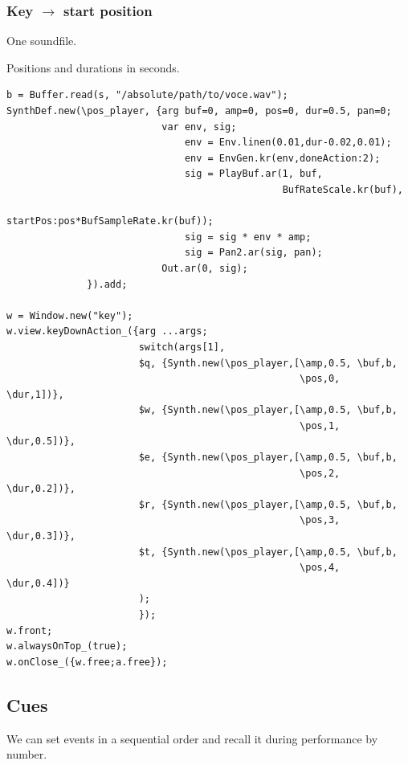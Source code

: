 \subsubsection{Key \(\rightarrow\) start position }\label{key-start-position}

One soundfile.

Positions and durations in seconds.

\begin{lstlisting}[frame=single, caption=playback key-start-position model] 
b = Buffer.read(s, "/absolute/path/to/voce.wav");
SynthDef.new(\pos_player, {arg buf=0, amp=0, pos=0, dur=0.5, pan=0;
                           var env, sig;
                               env = Env.linen(0.01,dur-0.02,0.01);
                               env = EnvGen.kr(env,doneAction:2);
                               sig = PlayBuf.ar(1, buf, 
                                                BufRateScale.kr(buf),
                                       startPos:pos*BufSampleRate.kr(buf));
                               sig = sig * env * amp;
                               sig = Pan2.ar(sig, pan);
                           Out.ar(0, sig);
              }).add;

w = Window.new("key");
w.view.keyDownAction_({arg ...args;
                       switch(args[1],
                       $q, {Synth.new(\pos_player,[\amp,0.5, \buf,b,
                                                   \pos,0,   \dur,1])},
                       $w, {Synth.new(\pos_player,[\amp,0.5, \buf,b,
                                                   \pos,1,   \dur,0.5])},
                       $e, {Synth.new(\pos_player,[\amp,0.5, \buf,b,
                                                   \pos,2,   \dur,0.2])},
                       $r, {Synth.new(\pos_player,[\amp,0.5, \buf,b,
                                                   \pos,3,   \dur,0.3])},
                       $t, {Synth.new(\pos_player,[\amp,0.5, \buf,b,
                                                   \pos,4,   \dur,0.4])}     
                       );
                       });
w.front;
w.alwaysOnTop_(true);
w.onClose_({w.free;a.free});
\end{lstlisting} 

\subsection{Cues}\label{cues}

We can set events in a sequential order and recall it during performance by number.

